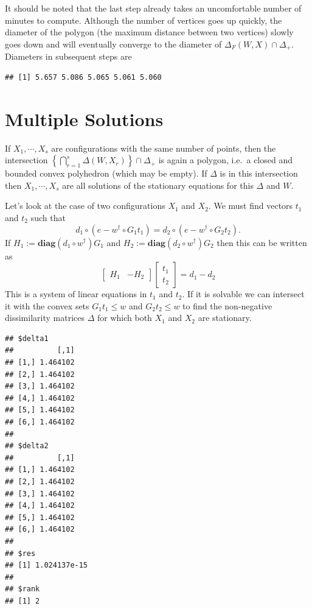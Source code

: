 \documentclass[
  12pt,
]{book}
\theoremstyle{definition}
\theoremstyle{definition}
\theoremstyle{definition}
\theoremstyle{definition}
\theoremstyle{remark}
\begin{document}
It should be noted that the last step already takes an uncomfortable number of minutes to compute. Although the number of vertices goes up
quickly, the diameter of the polygon (the maximum distance between two vertices) slowly goes down and will eventually converge to the diameter
of \(\Delta_F(W,X)\cap\Delta_+\). Diameters in subsequent steps are

\begin{verbatim}
## [1] 5.657 5.086 5.065 5.061 5.060
\end{verbatim}

\hypertarget{multiple-solutions}{%
\section{Multiple Solutions}\label{multiple-solutions}}

If \(X_1,\cdots,X_s\) are configurations with the same number of points, then the intersection \(\left\{\bigcap_{r=1}^s\Delta(W,X_r)\right\}\cap\Delta_+\) is again a polygon, i.e.~a closed and bounded convex polyhedron (which may be empty). If \(\Delta\) is in this intersection then \(X_1,\cdots,X_s\) are all solutions of the stationary equations for this \(\Delta\) and \(W\).

Let's look at the case of two configurations \(X_1\) and \(X_2\). We must find vectors \(t_1\) and \(t_2\) such that
\[
d_1\circ(e-w^\dagger\circ G_1t_1)=d_2\circ(e-w^\dagger\circ G_2t_2).
\]
If \(H_1:=\mathbf{diag}(d_1\circ w^\dagger)G_1\) and \(H_2:=\mathbf{diag}(d_2\circ w^\dagger)G_2\) then this can be written as
\[
\begin{bmatrix}H_1&-H_2\end{bmatrix}\begin{bmatrix}t_1\\t_2\end{bmatrix}=d_1-d_2
\]
This is a system of linear equations in \(t_1\) and \(t_2\). If it is solvable we can intersect it with the convex sets \(G_1t_1\leq w\) and \(G_2t_2\leq w\) to find the non-negative dissimilarity matrices \(\Delta\) for which both \(X_1\) and \(X_2\) are stationary.

\begin{verbatim}
## $delta1
##          [,1]
## [1,] 1.464102
## [2,] 1.464102
## [3,] 1.464102
## [4,] 1.464102
## [5,] 1.464102
## [6,] 1.464102
## 
## $delta2
##          [,1]
## [1,] 1.464102
## [2,] 1.464102
## [3,] 1.464102
## [4,] 1.464102
## [5,] 1.464102
## [6,] 1.464102
## 
## $res
## [1] 1.024137e-15
## 
## $rank
## [1] 2
\end{verbatim}
\end{document}
